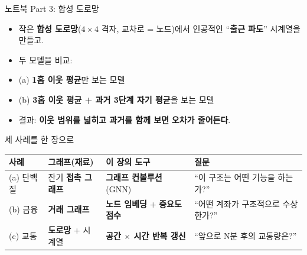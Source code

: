 \documentclass[aspectratio=169,11pt]{beamer}
\begin{document}

\begin{frame}{노트북 Part 3: 합성 도로망}
  \begin{itemize}
    \item 작은 \textbf{합성 도로망}($4\times 4$ 격자, 교차로 = 노드)에서
      인공적인 ``\textbf{출근 파도}'' 시계열을 만들고.
    \item 두 모델을 비교:
    \item (a) \textbf{1홉 이웃 평균}만 보는 모델
    \item (b) \textbf{3홉 이웃 평균 + 과거 3단계 자기 평균}을
      보는 모델
    \item 결과: \textbf{이웃 범위를 넓히고 과거를 함께 보면}
      \textbf{오차가 줄어든다}.
  \end{itemize}
\end{frame}

\begin{frame}{세 사례를 한 장으로}
  \small
  \begin{tabular}{@{}p{}p{}p{}p{}@{}}
    \toprule
    사례 & 그래프(재료) & 이 장의 도구 & 질문 \\
    \midrule
    (a) 단백질 & 잔기 \textbf{접촉 그래프}
      & \textbf{그래프 컨볼루션}(GNN) & ``이 구조는 어떤 기능을
      하는가?'' \\
    (b) 금융 & \textbf{거래 그래프}
      & \textbf{노드 임베딩} + \textbf{중요도 점수} & ``어떤 계좌가
      구조적으로 수상한가?'' \\
    (c) 교통 & \textbf{도로망} + 시계열
      & \textbf{공간 $\times$ 시간 반복 갱신} & ``앞으로 N분 후의
      교통량은?'' \\
    \bottomrule
  \end{tabular}
\end{frame}
\end{document}
